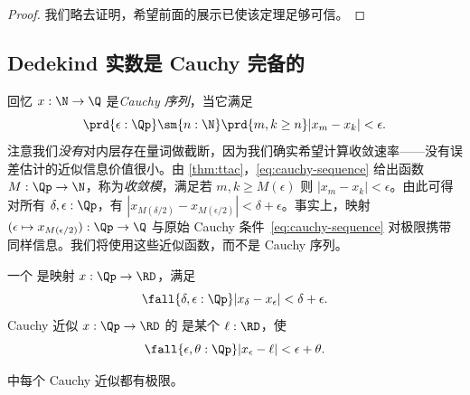 \begin{proof}
  我们略去证明，希望前面的展示已使该定理足够可信。
\end{proof}

\subsection{Dedekind 实数是 Cauchy 完备的}
\label{sec:RD-cauchy-complete}

回忆 $x : \N \to \Q$ 是\emph{Cauchy 序列}，当它满足
%
\begin{equation} \label{eq:cauchy-sequence}
  \prd{\epsilon : \Qp} \sm{n : \N} \prd{m, k \geq n} |x_m - x_k| < \epsilon.
\end{equation}
%
注意我们\emph{没有}对内层存在量词做截断，因为我们确实希望计算收敛速率——没有误差估计的近似信息价值很小。由 \cref{thm:ttac}，\eqref{eq:cauchy-sequence} 给出函数 $M
: \Qp \to \N$，称为\emph{收敛模}，满足若 $m, k \geq M(\epsilon)$ 则 $|x_m - x_k| < \epsilon$。由此可得对所有 $\delta, \epsilon : \Qp$，有 $|x_{M(\delta/2)} - x_{M(\epsilon/2)}|<
\delta + \epsilon$。事实上，映射 $(\epsilon \mapsto
x_{M(\epsilon/2)}) : \Qp \to \Q$ 与原始 Cauchy 条件~\eqref{eq:cauchy-sequence} 对极限携带同样信息。我们将使用这些近似函数，而不是 Cauchy 序列。

\begin{defn} \label{defn:cauchy-approximation}
  一个
  是映射 $x : \Qp \to \RD$，满足
  \begin{equation}
    \label{eq:cauchy-approx}
    \fall{\delta, \epsilon :\Qp} |x_\delta - x_\epsilon| < \delta + \epsilon.
  \end{equation}
  Cauchy 近似 $x : \Qp \to \RD$ 的
  是某个 $\ell : \RD$，使
  \begin{equation*}
    \fall{\epsilon, \theta : \Qp} |x_\epsilon - \ell| < \epsilon + \theta.
  \end{equation*}
\end{defn}

\begin{thm} \label{RD-cauchy-complete}
  \RD 中每个 Cauchy 近似都有极限。
\end{thm}

